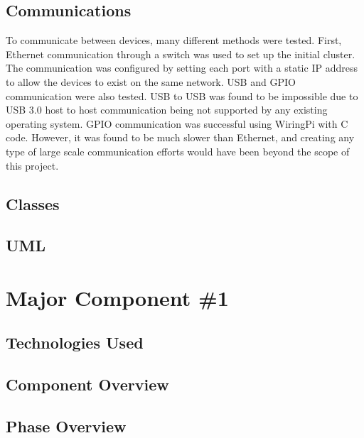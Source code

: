  \subsection{Communications}
	To communicate between devices, many different methods were tested. First, Ethernet communication through a switch was used to set up the initial cluster. The communication was configured by setting each port with a static IP address to allow the devices to exist on the same network.
	USB and GPIO communication were also tested. USB to USB was found to be impossible due to USB 3.0 host to host communication being not supported by any existing operating system. GPIO communication was successful using WiringPi with C code. However, it was found to be much slower than Ethernet, and creating any type of large scale communication efforts would have been beyond the scope of this project.
 
 \subsection{Classes}
 
 \subsection{UML}

\section{Major Component \#1 }

\subsection{Technologies  Used}
	 

\subsection{Component  Overview}

\subsection{Phase Overview}

